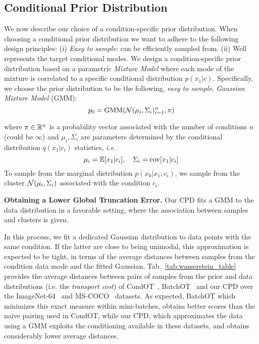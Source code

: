 \subsection{Conditional Prior Distribution}
\label{sec:prior_distribution}

We now describe our choice of a condition-specific prior distribution. 
When choosing a conditional prior distribution we want to adhere to the following design principles:
(i) \emph{Easy to sample}: can be efficiently sampled from.
(ii) Well represents the target conditional modes. 
We design a condition-specific prior distribution based on a parametric \emph{Mixture Model} where each mode of the mixture is correlated to a specific conditional distribution $p(x_1|c)$. 
Specifically, we choose the prior distribution to be the following, \emph{easy to sample}, \emph{Gaussian Mixture Model} (GMM):
\begin{equation}\label{eq:gmm_formula}
    p_0 = \mathrm{GMM}({\mathcal{N}}(\mu_i, \Sigma_i)_{i=1}^n, \pi)
\end{equation}

where $\pi\in\mathbb{R}^n$ is a probability vector associated with the number of conditions $n$ (could be $\infty$) and $\mu_i, \Sigma_i$ are parameters determined by the conditional distribution $q(x_1|c_i)$ statistics, \emph{i.e.} 
 \begin{equation}\label{eq:gmm_parameters}
     \mu_i = \mathbb{E}[x_1|c_i], \quad \Sigma_i = \mathrm{cov}[x_1|c_i]
 \end{equation}
To sample from the marginal distribution $p(x_0|x_1, c_i)$, we sample from the cluster ${\mathcal{N}}(\mu_i, \Sigma_i)$ associated with the condition $c_i$.

\noindent \textbf{Obtaining a Lower Global Truncation Error.} \quad 
Our CPD fits a GMM to the data distribution in a favorable setting, where the association between samples and clusters is given. 

In this process, we fit a dedicated Gaussian distribution to data points with the same condition. If the latter are close to being unimodal, this approximation is expected to be tight, in terms of the average distances between samples from the condition data mode and the fitted Gaussian. 
Tab.~\ref{tab:wasserstein_table} provides the average distances between pairs of samples from the prior and data distributions (i.e. the \emph{transport cost}) of CondOT~\cite{lipman2022flow}, BatchOT~\cite{pooladian2023multisample} and our CPD over the ImageNet-64~\cite{deng2009imagenet} and MS-COCO~\cite{lin2014microsoft} datasets. 
As expected, BatchOT which minimizes this exact measure within mini-batches, obtains better scores than the naïve pairing used in CondOT, while our CPD, which approximates the data using a GMM exploits the conditioning available in these datasets, and obtains considerably lower average distances.

